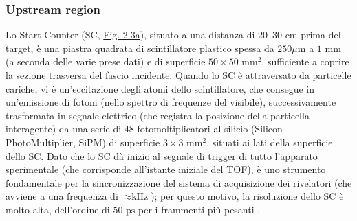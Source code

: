 \documentclass[12pt,a4paper,twoside]{report}
\begin{document}
	\subsubsection{Upstream region}
	Lo Start Counter (SC, \hyperref[fig:start_counter]{Fig. 2.3a}), situato a una distanza di $20$--$30\mbox{ cm}$ prima del target, è una piastra quadrata di scintillatore plastico spessa da $250\mbox{}\mu\mbox{m}$ a $1\mbox{ mm}$ (a seconda delle varie prese dati) e di superficie $50\times50\mbox{ mm}^2$, sufficiente a coprire la sezione trasversa del fascio incidente. Quando lo SC è attraversato da particelle cariche, vi è un'eccitazione degli atomi dello scintillatore, che consegue in un'emissione di fotoni (nello spettro di frequenze del visibile), successivamente trasformata in segnale elettrico (che registra la posizione della particella interagente) da una serie di $48$ fotomoltiplicatori al silicio (Silicon PhotoMultiplier, SiPM) di superficie $3\times3\mbox{ mm}^2$, situati ai lati della superficie dello SC. Dato che lo SC dà inizio al segnale di trigger di tutto l'apparato sperimentale (che corrisponde all'istante iniziale del TOF), è uno strumento fondamentale per la sincronizzazione del sistema di acquisizione dei rivelatori (che avviene a una frequenza di $\approx\mbox{kHz}$); per questo motivo, la risoluzione dello SC è molto alta, dell'ordine di $50\mbox{ ps}$ per i frammenti più pesanti \cite{foot_cdr,ubaldiArticle}.
	
\end{document}
